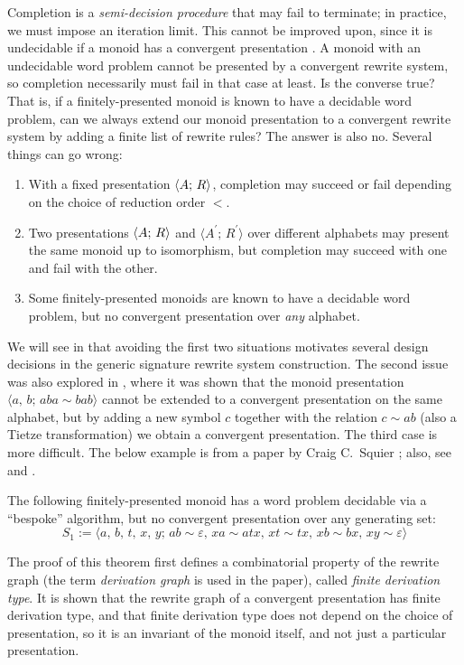 \documentclass[../generics]{subfiles}
\begin{document}
Completion is a \emph{semi-decision procedure} that may fail to terminate; in practice, we must impose an iteration limit. This cannot be improved upon, since it is undecidable if a monoid has a convergent presentation \cite{ODUNLAING1983339}. A monoid with an undecidable word problem cannot be presented by a convergent rewrite system, so completion necessarily must fail in that case at least. Is the converse true? That is, if a finitely-presented monoid is known to have a decidable word problem, can we always extend our monoid presentation to a convergent rewrite system by adding a finite list of rewrite rules? The answer is also no. Several things can go wrong:
\begin{enumerate}
\item With a fixed presentation $\langle A;\,R\rangle$, completion may succeed or fail depending on the choice of reduction order $<$.
\item Two presentations $\langle A;\,R\rangle$ and $\langle A^\prime;\,R^\prime\rangle$ over different alphabets may present the same monoid up to isomorphism, but completion may succeed with one and fail with the other.
\item Some finitely-presented monoids are known to have a decidable word problem, but no convergent presentation over \emph{any} alphabet.
\end{enumerate}
We will see in  that avoiding the first two situations motivates several design decisions in the generic signature rewrite system construction. The second issue was also explored in \cite{KAPUR1985337}, where it was shown that the monoid presentation $\langle a,\,b;\,aba\sim bab\rangle$ cannot be extended to a convergent presentation on the same alphabet, but by adding a new symbol $c$ together with the relation $c\sim ab$ (also a Tietze transformation) we obtain a convergent presentation. The third case is more difficult. The below example is from a paper by Craig C.~Squier \cite{SQUIER1994271}; also, see \cite{Lafont1991ChurchRooserPA} and \cite{LAFONT1995229}.
\begin{theorem}\label{squier s1} The following finitely-presented monoid has a word problem decidable via a ``bespoke'' algorithm, but no convergent presentation over any generating set:
\[S_1:=\langle a,\,b,\,t,\,x,\,y;\,ab\sim \varepsilon,\,xa\sim atx,\,xt\sim tx,\,xb\sim bx,\,xy\sim \varepsilon\rangle\]
\end{theorem}
The proof of this theorem first defines a combinatorial property of the rewrite graph (the term \emph{derivation graph} is used in the paper), called \emph{finite derivation type}. It is shown that the rewrite graph of a convergent presentation has finite derivation type, and that finite derivation type does not depend on the choice of presentation, so it is an invariant of the monoid itself, and not just a particular presentation.
\end{document}
